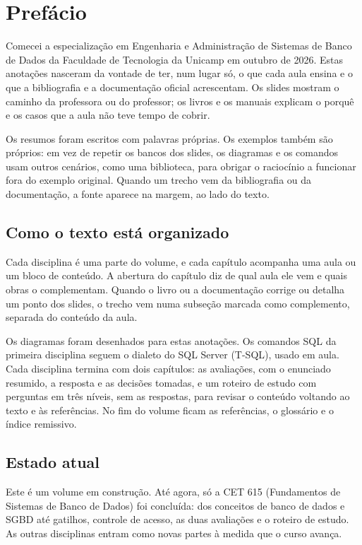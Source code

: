 \chapter*{Prefácio}

Comecei a especialização em Engenharia e Administração de Sistemas de
Banco de Dados da Faculdade de Tecnologia da Unicamp em outubro de 2026.
Estas anotações nasceram da vontade de ter, num lugar só, o que cada aula
ensina e o que a bibliografia e a documentação oficial acrescentam. Os
slides mostram o caminho da professora ou do professor; os livros e os
manuais explicam o porquê e os casos que a aula não teve tempo de cobrir.

Os resumos foram escritos com palavras próprias. Os exemplos também são
próprios: em vez de repetir os bancos dos slides, os diagramas e os
comandos usam outros cenários, como uma biblioteca, para obrigar o
raciocínio a funcionar fora do exemplo original. Quando um trecho vem da
bibliografia ou da documentação, a fonte aparece na margem, ao lado do
texto.

\section*{Como o texto está organizado}

Cada disciplina é uma parte do volume, e cada capítulo acompanha uma aula
ou um bloco de conteúdo. A abertura do capítulo diz de qual aula ele vem
e quais obras o complementam. Quando o livro ou a documentação corrige
ou detalha um ponto dos slides, o trecho vem numa subseção marcada como
complemento, separada do conteúdo da aula.

Os diagramas foram desenhados para estas anotações. Os comandos SQL da
primeira disciplina seguem o dialeto do SQL Server (T-SQL), usado em
aula. Cada disciplina termina com dois capítulos: as avaliações, com o
enunciado resumido, a resposta e as decisões tomadas, e um roteiro de
estudo com perguntas em três níveis, sem as respostas, para revisar o
conteúdo voltando ao texto e às referências. No fim do volume ficam as
referências, o glossário e o índice remissivo.

\section*{Estado atual}

Este é um volume em construção. Até agora, só a CET 615 (Fundamentos de
Sistemas de Banco de Dados) foi concluída: dos conceitos de banco de
dados e SGBD até gatilhos, controle de acesso, as duas avaliações e o
roteiro de estudo. As outras disciplinas entram como novas partes à medida
que o curso avança.

